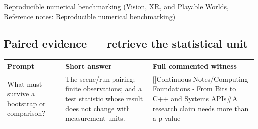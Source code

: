 \href{../07-Vision-XR-and-Playable-Worlds/main.pdf\#nameddest=appendix-b9db93e28371}{Reproducible numerical benchmarking (Vision, XR, and Playable Worlds, Reference notes: Reproducible numerical benchmarking)}

\subsection{Paired evidence --- retrieve the statistical unit}\label{appendix-cb5af353ef77-paired-evidence-retrieve-the-statistical-unit}

{\def\LTcaptype{none} %
\begin{longtable}[]{@{}
  >{\raggedright\arraybackslash}p{}
  >{\raggedright\arraybackslash}p{}
  >{\raggedright\arraybackslash}p{}@{}}
\toprule\noalign{}
\begin{minipage}[b]{\linewidth}\raggedright
Prompt
\end{minipage} & \begin{minipage}[b]{\linewidth}\raggedright
Short answer
\end{minipage} & \begin{minipage}[b]{\linewidth}\raggedright
Full commented witness
\end{minipage} \\
\midrule\noalign{}
\endhead
\bottomrule\noalign{}
\endlastfoot
What must survive a bootstrap or comparison? & The scene/run pairing; finite observations; and a test statistic whose result does not change with measurement units. & {[}{[}Continuous Notes/Computing Foundations - From Bits to C++ and Systems APIs\#A research claim needs more than a p-value \\
\end{longtable}
}
